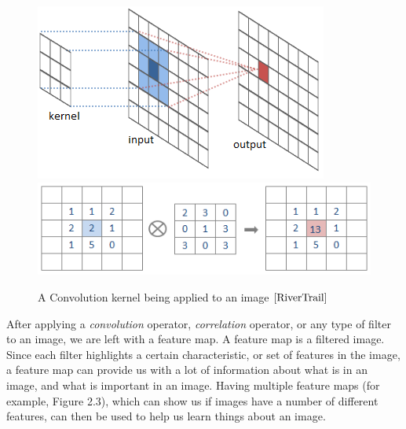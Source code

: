 \documentclass[12pt]{report} %
\begin{document}
\begin{figure}
\centering
\includegraphics{RiverTrain-ImageConvDiagram} 
\includegraphics{convolution4}
\caption{A Convolution kernel being applied to an image $\cite{RiverTrail}$}
\end{figure}	 
	 
	 After applying a \emph{convolution} operator, \emph{correlation} operator, or any type of filter to an image, we are left with a feature map. A feature map is a filtered image. Since each filter highlights a certain characteristic, or set of features in the image, a feature map can provide us with a lot of information about what is in an image, and what is important in an image\cite{aurelienMachineLearning}. Having multiple feature maps (for example, Figure 2.3), which can show us if images have a number of different features, can then be used to help us learn things about an image.
\end{document}
